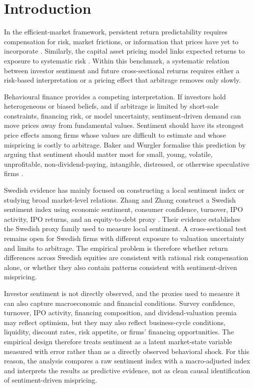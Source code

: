 \documentclass[11pt]{article}
\begin{document}

\section{Introduction}
In the efficient-market framework, persistent return predictability requires compensation for risk, market frictions, or information that prices have yet to incorporate \citep{fama1970efficient,fama1991efficient}. Similarly, the capital asset pricing model links expected returns to exposure to systematic risk \citep{sharpe1964capital}. Within this benchmark, a systematic relation between investor sentiment and future cross-sectional returns requires either a risk-based interpretation or a pricing effect that arbitrage removes only slowly.

Behavioural finance provides a competing interpretation. If investors hold heterogeneous or biased beliefs, and if arbitrage is limited by short-sale constraints, financing risk, or model uncertainty, sentiment-driven demand can move prices away from fundamental values. Sentiment should have its strongest price effects among firms whose values are difficult to estimate and whose mispricing is costly to arbitrage. Baker and Wurgler formalise this prediction by arguing that sentiment should matter most for small, young, volatile, unprofitable, non-dividend-paying, intangible, distressed, or otherwise speculative firms \citep{baker2006sentiment,baker2007}.

Swedish evidence has mainly focused on constructing a local sentiment index or studying broad market-level relations. Zhang and Zhang construct a Swedish sentiment index using economic sentiment, consumer confidence, turnover, IPO activity, IPO returns, and an equity-to-debt proxy \citep{zhang2023sweden}. Their evidence establishes the Swedish proxy family used to measure local sentiment. A cross-sectional test remains open for Swedish firms with different exposure to valuation uncertainty and limits to arbitrage. The empirical problem is therefore whether return differences across Swedish equities are consistent with rational risk compensation alone, or whether they also contain patterns consistent with sentiment-driven mispricing.

Investor sentiment is not directly observed, and the proxies used to measure it can also capture macroeconomic and financial conditions. Survey confidence, turnover, IPO activity, financing composition, and dividend-valuation premia may reflect optimism, but they may also reflect business-cycle conditions, liquidity, discount rates, risk appetite, or firms' financing opportunities. The empirical design therefore treats sentiment as a latent market-state variable measured with error rather than as a directly observed behavioral shock. For this reason, the analysis compares a raw sentiment index with a macro-adjusted index and interprets the results as predictive evidence, not as clean causal identification of sentiment-driven mispricing.
\end{document}
